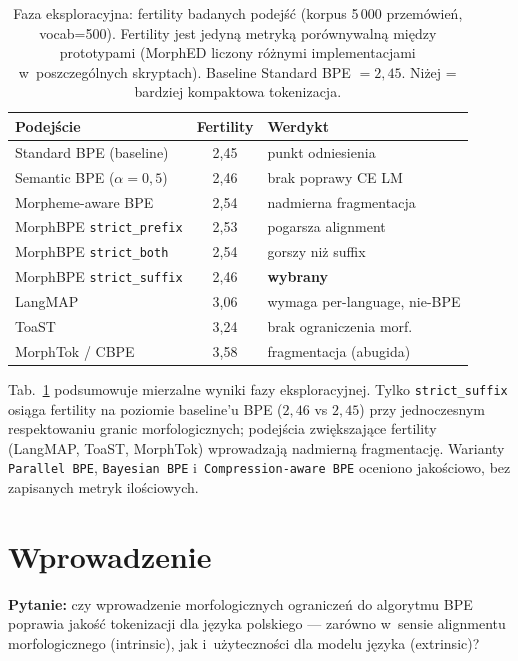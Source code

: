 \begin{table}[h]
  \centering
  \caption{Faza eksploracyjna: fertility badanych podejść
  (korpus 5\,000 przemówień, vocab=500). Fertility jest jedyną
  metryką porównywalną między prototypami (MorphED liczony różnymi
  implementacjami w~poszczególnych skryptach). Baseline Standard BPE
  $=2{,}45$. Niżej = bardziej kompaktowa tokenizacja.}
  \label{tab:exploration}
  \small
  \begin{tabular}{lcl}
    \toprule
    Podejście & Fertility & Werdykt \\
    \midrule
    \rowcolor{slayergreen!20}
    Standard BPE (baseline)      & 2{,}45 & punkt odniesienia \\
    Semantic BPE ($\alpha{=}0{,}5$) & 2{,}46 & brak poprawy CE LM \\
    Morpheme-aware BPE           & 2{,}54 & nadmierna fragmentacja \\
    MorphBPE \texttt{strict\_prefix} & 2{,}53 & pogarsza alignment \\
    MorphBPE \texttt{strict\_both}   & 2{,}54 & gorszy niż suffix \\
    \rowcolor{slayergreen!20}
    MorphBPE \texttt{strict\_suffix} & 2{,}46 & \textbf{wybrany} \\
    LangMAP                      & 3{,}06 & wymaga per-language, nie-BPE \\
    ToaST                        & 3{,}24 & brak ograniczenia morf. \\
    MorphTok / CBPE              & 3{,}58 & fragmentacja (abugida) \\
    \bottomrule
  \end{tabular}
\end{table}

Tab.~\ref{tab:exploration} podsumowuje mierzalne wyniki fazy
eksploracyjnej. Tylko \texttt{strict\_suffix} osiąga fertility
na poziomie baseline'u BPE ($2{,}46$ vs $2{,}45$) przy jednoczesnym
respektowaniu granic morfologicznych; podejścia zwiększające
fertility (LangMAP, ToaST, MorphTok) wprowadzają nadmierną
fragmentację. Warianty \texttt{Parallel BPE}, \texttt{Bayesian BPE}
i~\texttt{Compression-aware BPE} oceniono jakościowo, bez zapisanych
metryk ilościowych.

\section{Wprowadzenie}

\textbf{Pytanie:} czy wprowadzenie morfologicznych ograniczeń
do algorytmu BPE poprawia jakość tokenizacji dla języka polskiego
--- zarówno w~sensie alignmentu morfologicznego (intrinsic),
jak i~użyteczności dla modelu języka (extrinsic)?

